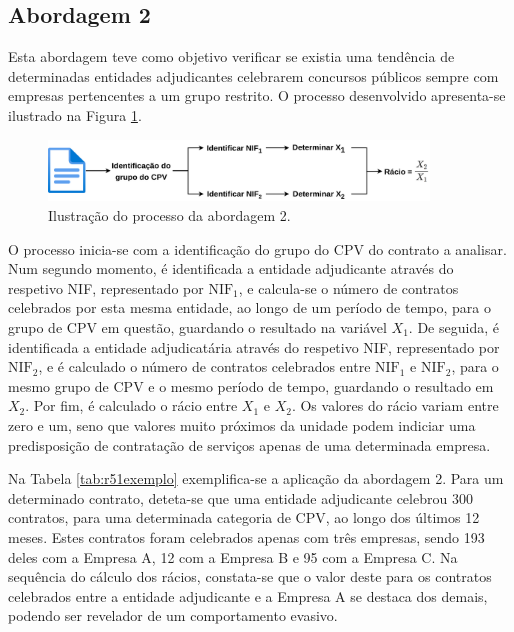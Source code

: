 \subsection{Abordagem 2}

Esta abordagem teve como objetivo verificar se existia uma tendência de determinadas entidades adjudicantes celebrarem concursos públicos sempre com empresas pertencentes a um grupo restrito. O processo desenvolvido apresenta-se ilustrado na Figura \ref{fig:ab2}. 

\begin{figure}[H]
	\centering
	\includegraphics[width=0.9\textwidth]{imagens/r51/r51_v1.png}
	\caption{Ilustração do processo da abordagem 2.}
	\label{fig:ab2}
\end{figure}

O processo inicia-se com a identificação do grupo do CPV do contrato a analisar. Num segundo momento, é identificada a entidade adjudicante através do respetivo NIF, representado por $\text{NIF}_1$, e calcula-se o número de contratos celebrados por esta mesma entidade, ao longo de um período de tempo, para o grupo de CPV em questão, guardando o resultado na variável $X_1$. De seguida, é identificada a entidade adjudicatária através do respetivo NIF, representado por $\text{NIF}_2$, e é calculado o número de contratos celebrados entre $\text{NIF}_1$ e $\text{NIF}_2$, para o mesmo grupo de CPV e o mesmo período de tempo, guardando o resultado em $X_2$. Por fim, é calculado o rácio entre $X_1$ e $X_2$. Os valores do rácio variam entre zero e um, seno que valores muito próximos da unidade podem indiciar uma predisposição de contratação de serviços apenas de uma determinada empresa. 

Na Tabela \ref{tab:r51exemplo} exemplifica-se a aplicação da abordagem 2. Para um determinado contrato, deteta-se que uma entidade adjudicante celebrou 300 contratos, para uma determinada categoria de CPV, ao longo dos últimos 12 meses. Estes contratos foram celebrados apenas com três empresas, sendo 193 deles com a Empresa A, 12 com a Empresa B e 95 com a Empresa C. Na sequência do cálculo dos rácios, constata-se que o valor deste para os contratos celebrados entre a entidade adjudicante e a Empresa A se destaca dos demais, podendo ser revelador de um comportamento evasivo. 

